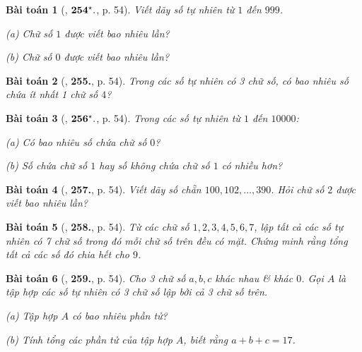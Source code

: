 \documentclass{article}
\numberwithin{equation}{section}
\newtheorem{baitoan}{Bài toán}[section]
\begin{document}
\begin{baitoan}[\cite{Binh_Toan_6_tap_1}, $\bf 254^\star.$, p. 54]
	Viết dãy số tự nhiên từ $1$ đến $999$.
	\begin{enumerate*}
		\item[(a)] Chữ số $1$ được viết bao nhiêu lần?
		\item[(b)] Chữ số $0$ được viết bao nhiêu lần?
	\end{enumerate*}
\end{baitoan}

\begin{baitoan}[\cite{Binh_Toan_6_tap_1}, \textbf{255.}, p. 54]
	Trong các số tự nhiên có 3 chữ số, có bao nhiêu số chứa ít nhất 1 chữ số $4$?
\end{baitoan}

\begin{baitoan}[\cite{Binh_Toan_6_tap_1}, $\bf 256^\star.$, p. 54]
	Trong các số tự nhiên từ $1$ đến $10000$:
	\begin{enumerate*}
		\item[(a)] Có bao nhiêu số chứa chữ số $0$?
		\item[(b)] Số chứa chữ số $1$ hay số không chứa chữ số $1$ có nhiều hơn?
	\end{enumerate*}
\end{baitoan}

\begin{baitoan}[\cite{Binh_Toan_6_tap_1}, \textbf{257.}, p. 54]
	Viết dãy số chẵn $100,102,\ldots,390$. Hỏi chữ số $2$ được viết bao nhiêu lần?
\end{baitoan}

\begin{baitoan}[\cite{Binh_Toan_6_tap_1}, \textbf{258.}, p. 54]
	Từ các chữ số $1,2,3,4,5,6,7$, lập tất cả các số tự nhiên có 7 chữ số trong đó mỗi chữ số trên đều có mặt. Chứng minh rằng tổng tất cả các số đó chia hết cho $9$.
\end{baitoan}

\begin{baitoan}[\cite{Binh_Toan_6_tap_1}, \textbf{259.}, p. 54]
	Cho 3 chữ số $a,b,c$ khác nhau \& khác $0$. Gọi $A$ là tập hợp các số tự nhiên có 3 chữ số lập bởi cả 3 chữ số trên.
	\begin{enumerate*}
		\item[(a)] Tập hợp $A$ có bao nhiêu phần tử?
		\item[(b)] Tính tổng các phần tử của tập hợp $A$, biết rằng $a + b + c = 17$.
	\end{enumerate*}
\end{baitoan}
\end{document}
